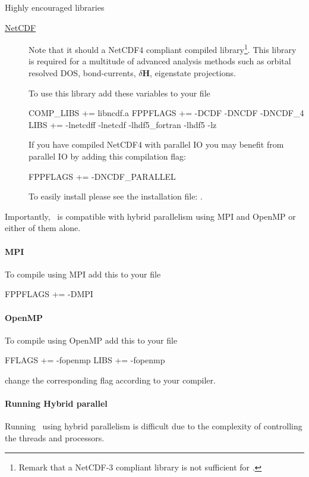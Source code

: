 Highly encouraged libraries
\begin{description}
  \item[\href{https://www.unidata.ucar.edu/software/netcdf}{NetCDF}] %
  Note that it should a NetCDF4 compliant compiled
  library\footnote{Remark that a NetCDF-3 compliant library is not
      sufficient for \tbtrans.}. This library is required for a
  multitude of advanced analysis methods such as orbital resolved DOS,
  bond-currents, $\delta \mathbf H$, eigenstate projections.

  To use this library add these variables to your 
  file
\begin{shellexample}
  COMP_LIBS += libncdf.a
  FPPFLAGS += -DCDF -DNCDF -DNCDF_4
  LIBS += -lnetcdff -lnetcdf -lhdf5_fortran -lhdf5 -lz
\end{shellexample}

  If you have compiled NetCDF4 with parallel IO you may benefit from
  parallel IO by adding this compilation flag:
\begin{shellexample}
  FPPFLAGS += -DNCDF_PARALLEL
\end{shellexample}

  To easily install  please see the installation file:
  .
  
\end{description}

Importantly, \tbtrans\ is compatible with hybrid parallelism using MPI
and OpenMP or either of them alone. 

\paragraph{MPI}
To compile using MPI add this to your  file
\begin{shellexample}
 FPPFLAGS += -DMPI
\end{shellexample}

\paragraph{OpenMP}
To compile using OpenMP add this to your  file
\begin{shellexample}
 FFLAGS += -fopenmp
 LIBS += -fopenmp
\end{shellexample}
change the corresponding flag according to your compiler.

\paragraph{Running Hybrid parallel \tbtrans}
%
Running \tbtrans\ using hybrid parallelism is difficult due to the
complexity of controlling the threads and processors.


